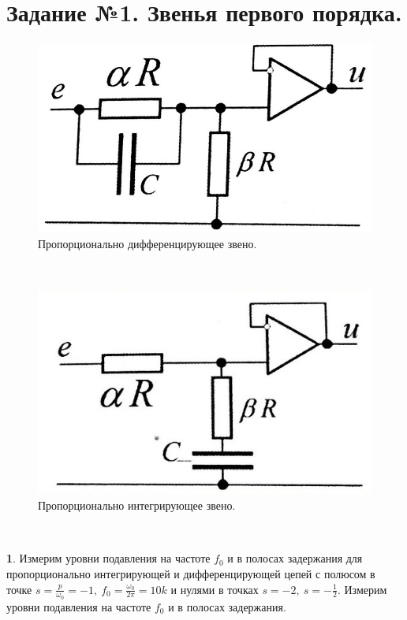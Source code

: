 \documentclass[a4paper, 12pt, twoside]{article}
\begin{document}
\section*{Задание №1. Звенья первого порядка.}

\begin{minipage}[\left]{0.4\linewidth}
	\begin{figure}[H]
			\centering
			\includegraphics[width =  0.8\linewidth]{dif}
			\caption{Пропорционально дифференцирующее звено.}
	\end{figure}
\end{minipage}
~
\begin{minipage}[\right]{0.4\linewidth}
	\begin{figure}[H]
			\centering
			\includegraphics[width =  0.8\linewidth]{int}
			\caption{Пропорционально интегрирующее звено.}
	\end{figure}
\end{minipage}

~
\vspace{\baselineskip}

\textbf{1}. Измерим уровни подавления на частоте $f_0$ и в полосах задержания для пропорционально интегрирующей и дифференцирующей цепей с полюсом в точке $s = \frac{p}{\omega_0}= -1,~ f_0 = \frac{\omega_0}{2\pi} = 10k$ и нулями в точках $s=-2,~s=-\frac{1}{2}$.  Измерим уровни подавления на частоте $f_0$ и в полосах задержания.
\end{document}
